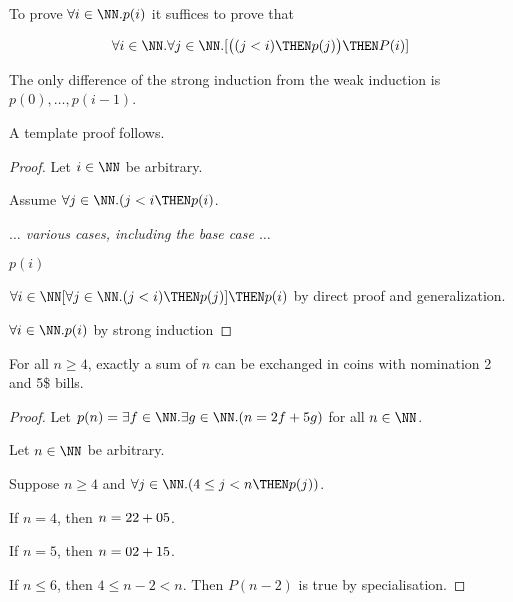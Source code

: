 \documentclass[11pt]{scrartcl}
\begin{document}
To prove $\forall i\in \NN. p(i)$ it suffices to prove that

\[\forall i\in\NN.\forall j\in\NN.[\big((j<i)\THEN p(j)\big)\THEN P(i)]\]
  
The only difference of the strong induction from the weak induction is
$p(0), \dots, p(i-1)$.

A template proof follows.
\begin{proof}
Let $i\in\NN$ be arbitrary.

Assume $\forall j\in\NN.(j<i \THEN p(i)$.

\textit{$\dots$ various cases, including the base case $\dots$}

$p(i)$

$\forall i\in \NN[\forall j\in\NN.(j <i)\THEN p(j)]\THEN p(i)$ by direct proof and generalization.

$\forall i\in\NN.p(i)$ by strong induction
\end{proof}

\begin{theorem}
  For all $n\geq 4$, exactly a sum of $n$ can be exchanged in coins
  with nomination 2 and 5\$ bills.
\end{theorem}
\begin{proof}
  Let $p(n) = \exists f\in\NN.\exists g\in\NN.(n = 2f+ 5g)$ for all $n\in\NN$.

  Let $n\in\NN$ be arbitrary.

  Suppose $n\geq 4$ and $\forall j\in \NN.(4\leq j < n \THEN p(j))$.

  If $n=4$, then $n = 2\* 2 +0\*5$.

  If $n=5$, then $n = 0\*2 + 1\*5$.

  If $n\leq 6$, then $4\leq n-2 <n$. Then $P(n-2)$ is true by specialisation.
\end{proof}
\end{document}
